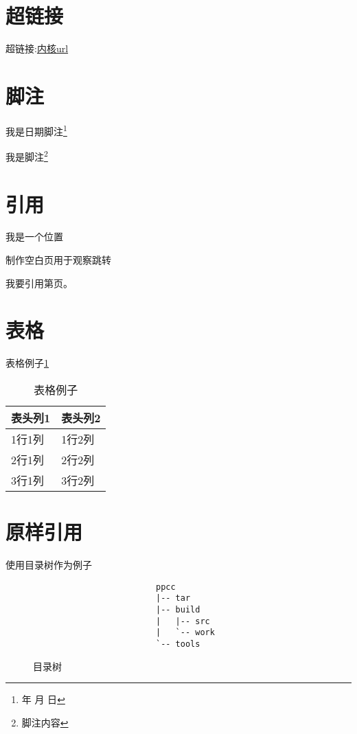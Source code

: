 \documentclass[12pt,a4paper]{article}
\renewcommand{\today}{\number\year 年 \number\month 月 \number\day 日}
\begin{document}
\section{超链接} 
超链接:\href{http://ftp.kernel.org/pub/linux/kernel/v3.x/}{内核url}

\section{脚注} 
我是日期脚注\footnote{\today}

我是脚注\footnote{脚注内容}

\section{引用} 
我是一个位置\label{标签1}

制作空白页用于观察跳转
\newpage

我要引用第\pageref{标签1}页。

\section{表格} 
表格例子\ref{表格例子}
\begin{table}[!hbp]
\begin{center}
    \begin{tabular}{|l|l|}
        \hline
        表头列1 & 表头列2 \\
        \hline
        1行1列 & 1行2列 \\
        \hline
        2行1列 & 2行2列 \\
        \hline
        3行1列 & 3行2列 \\
        \hline
    \end{tabular}
    \caption{表格例子\label{表格例子}}
\end{center}
\end{table}

\section{原样引用}
使用目录树作为例子
\setlength{\unitlength}{1mm}
\begin{figure}[!hbp]
\begin{verbatim}
                         ppcc
                         |-- tar
                         |-- build
                         |   |-- src
                         |   `-- work
                         `-- tools
\end{verbatim}
\caption{目录树\label{目录树}}
\end{figure}
\end{document}
